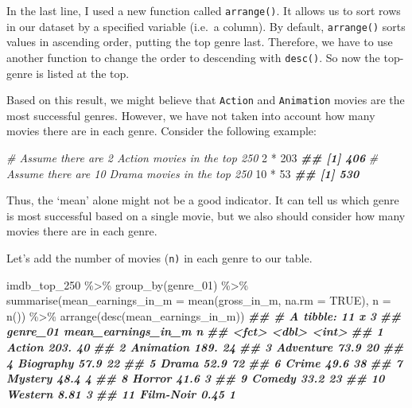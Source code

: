 \documentclass[
]{book}
\newenvironment{Shaded}{\begin{snugshade}}{\end{snugshade}}
\newcommand{\AttributeTok}[1]{\textcolor[rgb]{0.77,0.63,0.00}{#1}}
\newcommand{\CommentTok}[1]{\textcolor[rgb]{0.56,0.35,0.01}{\textit{#1}}}
\newcommand{\ConstantTok}[1]{\textcolor[rgb]{0.00,0.00,0.00}{#1}}
\newcommand{\DecValTok}[1]{\textcolor[rgb]{0.00,0.00,0.81}{#1}}
\newcommand{\DocumentationTok}[1]{\textcolor[rgb]{0.56,0.35,0.01}{\textbf{\textit{#1}}}}
\newcommand{\FunctionTok}[1]{\textcolor[rgb]{0.00,0.00,0.00}{#1}}
\newcommand{\NormalTok}[1]{#1}
\newcommand{\SpecialCharTok}[1]{\textcolor[rgb]{0.00,0.00,0.00}{#1}}
\begin{document}
In the last line, I used a new function called \texttt{arrange()}. It allows us to sort rows in our dataset by a specified variable (i.e.~a column). By default, \texttt{arrange()} sorts values in ascending order, putting the top genre last. Therefore, we have to use another function to change the order to descending with \texttt{desc()}. So now the top-genre is listed at the top.

Based on this result, we might believe that \texttt{Action} and \texttt{Animation} movies are the most successful genres. However, we have not taken into account how many movies there are in each genre. Consider the following example:

\begin{Shaded}
\begin{Highlighting}[]
\CommentTok{\# Assume there are 2 Action movies in the top 250}
\DecValTok{2} \SpecialCharTok{*} \DecValTok{203}
\DocumentationTok{\#\# [1] 406}
\CommentTok{\# Assume there are 10 Drama movies in the top 250}
\DecValTok{10} \SpecialCharTok{*} \DecValTok{53}
\DocumentationTok{\#\# [1] 530}
\end{Highlighting}
\end{Shaded}

Thus, the `mean' alone might not be a good indicator. It can tell us which genre is most successful based on a single movie, but we also should consider how many movies there are in each genre.

Let's add the number of movies (\texttt{n)} in each genre to our table.

\begin{Shaded}
\begin{Highlighting}[]
\NormalTok{imdb\_top\_250 }\SpecialCharTok{\%\textgreater{}\%}
  \FunctionTok{group\_by}\NormalTok{(genre\_01) }\SpecialCharTok{\%\textgreater{}\%}
  \FunctionTok{summarise}\NormalTok{(}\AttributeTok{mean\_earnings\_in\_m =} \FunctionTok{mean}\NormalTok{(gross\_in\_m, }\AttributeTok{na.rm =} \ConstantTok{TRUE}\NormalTok{),}
            \AttributeTok{n =} \FunctionTok{n}\NormalTok{()) }\SpecialCharTok{\%\textgreater{}\%}
  \FunctionTok{arrange}\NormalTok{(}\FunctionTok{desc}\NormalTok{(mean\_earnings\_in\_m))}
\DocumentationTok{\#\# \# A tibble: 11 x 3}
\DocumentationTok{\#\#    genre\_01  mean\_earnings\_in\_m     n}
\DocumentationTok{\#\#    \textless{}fct\textgreater{}                  \textless{}dbl\textgreater{} \textless{}int\textgreater{}}
\DocumentationTok{\#\#  1 Action                203.      40}
\DocumentationTok{\#\#  2 Animation             189.      24}
\DocumentationTok{\#\#  3 Adventure              73.9     20}
\DocumentationTok{\#\#  4 Biography              57.9     22}
\DocumentationTok{\#\#  5 Drama                  52.9     72}
\DocumentationTok{\#\#  6 Crime                  49.6     38}
\DocumentationTok{\#\#  7 Mystery                48.4      4}
\DocumentationTok{\#\#  8 Horror                 41.6      3}
\DocumentationTok{\#\#  9 Comedy                 33.2     23}
\DocumentationTok{\#\# 10 Western                 8.81     3}
\DocumentationTok{\#\# 11 Film{-}Noir               0.45     1}
\end{Highlighting}
\end{Shaded}
\end{document}
